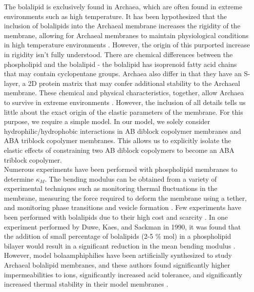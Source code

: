 \documentclass[twocolumn,aps,floatfix,nobibnotes]{revtex4-1}
\begin{document}
The bolalipid is exclusively found in Archaea, which are often found in extreme environments such as high temperature. It has been hypothesized that the inclusion of bolalipids into the Archaeal membrane increases the rigidity of the membrane, allowing for Archaeal membranes to maintain physiological conditions in high temperature environments \cite{oger2013adaptation,van1998essence,koga2007biosynthesis,de1986structure}. However, the origin of this purported increase in rigidity isn't fully understood. There are chemical differences between the phospholipid and the bolalipid - the bolalipid has isoprenoid fatty acid chains that may contain cyclopentane groups. Archaea also differ in that they have an S-layer, a 2D protein matrix that may confer additional stability to the Archaeal membrane. These chemical and physical characteristics, together, allow Archaea to survive in extreme environments \cite{oger2013adaptation}. However, the inclusion of all details tells us little about the exact origin of the elastic parameters of the membrane. For this purpose, we require a simple model. In our model, we solely consider hydrophilic/hydrophobic interactions in AB diblock copolymer membranes and ABA triblock copolymer membranes. This allows us to explicitly isolate the elastic effects of constraining two AB diblock copolymers to become an ABA triblock copolymer. \\
\indent Numerous experiments have been performed with phospholipid membranes to determine $\kappa_M$. The bending modulus can be obtained from a variety of experimental techniques such as monitoring thermal fluctuations in the membrane, measuring the force required to deform the membrane using a tether, and monitoring phase transitions and vesicle formation \cite{schneider1984thermal, faucon1989bending, rheinstadter2006dispersion, bo1989determination,cuvelier2005coalescence}. Few experiments have been performed with bolalipids due to their high cost and scarcity \cite{bode2008extraction}. In one experiment performed by Duwe, Kaes, and Sackman in 1990, it was found that the addition of small percentage of bolalipids (2-5 $\%$ mol) in a phospholipid bilayer would result in a significant reduction in the mean bending modulus \cite{duwe1990bending}. However, model bolaamphiphilies have been artificially synthesized to study Archaeal bolalipid membranes, and these authors found significantly higher impermeabilities to ions, significantly increased acid tolerance, and significantly increased thermal stability in their model membranes \cite{berkowitz1993new,yamauchi1993highly}. 
\end{document}
